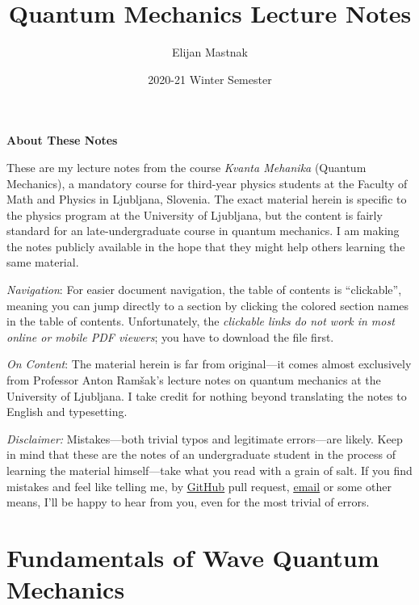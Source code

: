 \documentclass[11pt, a4paper]{article}
\begin{document}
\title{Quantum Mechanics Lecture Notes}
\author{Elijan Mastnak}
\date{2020-21 Winter Semester}
\maketitle

\begin{center}
\textbf{About These Notes}
\end{center}
These are my lecture notes from the course \textit{Kvanta Mehanika} (Quantum Mechanics), a mandatory course for third-year physics students at the Faculty of Math and Physics in Ljubljana, Slovenia. The exact material herein is specific to the physics program at the University of Ljubljana, but the content is fairly standard for an late-undergraduate course in quantum mechanics. I am making the notes publicly available in the hope that they might help others learning the same material.


\vspace{2mm}
\textit{Navigation}: For easier document navigation, the table of contents is ``clickable'', meaning you can jump directly to a section by clicking the colored section names in the table of contents. Unfortunately, the \textit{clickable links do not work in most online or mobile PDF viewers}; you have to download the file first.

\vspace{2mm}
\textit{On Content}: The material herein is far from original---it comes almost exclusively from Professor Anton Ram\v{s}ak's lecture notes on quantum mechanics at the University of Ljubljana. I take credit for nothing beyond translating the notes to English and typesetting.

\vspace{2mm}
\textit{Disclaimer:} Mistakes---both trivial typos and legitimate errors---are likely. Keep in mind that these are the notes of an undergraduate student in the process of learning the material himself---take what you read with a grain of salt. If you find mistakes and feel like telling me, by \href{https://github.com/ejmastnak/fmf}{\underline{GitHub}} pull request, \href{mailto:ejmastnak@gmail.com}{\underline{email}} or some other means, I'll be happy to hear from you, even for the most trivial of errors.

\newpage

\tableofcontents

\newpage

\pagestyle{headerstyle}
\section{Fundamentals of Wave Quantum Mechanics}
\end{document}
